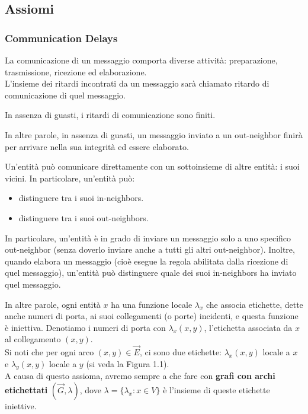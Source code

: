 \subsection{Assiomi}
\subsubsection{Communication Delays}
La comunicazione di un messaggio comporta diverse attività: preparazione,
trasmissione, ricezione ed elaborazione.\\
L'insieme dei ritardi incontrati da un messaggio sarà chiamato ritardo di
comunicazione di quel messaggio.

\begin{axch}
    In assenza di guasti, i ritardi di comunicazione sono finiti.
\end{axch}

In altre parole, in assenza di guasti, un messaggio inviato a un out-neighbor
finirà per arrivare nella sua integrità ed essere elaborato.

\begin{axch}\label{axch:local-orientation}
    Un'entità può comunicare direttamente con un sottoinsieme di altre entità: i
    suoi vicini. In particolare, un'entità può:
    \begin{itemize}
        \item distinguere tra i suoi in-neighbors.
        \item distinguere tra i suoi out-neighbors.
    \end{itemize}
\end{axch}

In particolare, un'entità è in grado di inviare un messaggio solo a uno
specifico out-neighbor (senza doverlo inviare anche a tutti gli altri
out-neighbor). Inoltre, quando elabora un messaggio (cioè esegue la regola
abilitata dalla ricezione di quel messaggio), un'entità può distinguere quale
dei suoi in-neighbors ha inviato quel messaggio.

In altre parole, ogni entità $x$ ha una funzione locale $\lambda_x$ che associa
etichette, dette anche numeri di porta, ai suoi collegamenti (o porte)
incidenti, e questa funzione è iniettiva. Denotiamo i numeri di porta con
$\lambda_x (x, y)$, l'etichetta associata da $x$ al collegamento $(x, y)$.\\
Si noti che per ogni arco $(x, y) \in \overrightarrow{E}$, ci sono due
etichette: $\lambda_x (x, y)$ locale a $x$ e $\lambda_y (x, y)$ locale a $y$ (si
veda la Figura 1.1).\\
A causa di questo assioma, avremo sempre a che fare con \textbf{grafi con archi
    etichettati} $(\overrightarrow{G}, \lambda)$, dove $\lambda = \{\lambda_x : x \in
    V \}$ è l'insieme di queste etichette iniettive.

